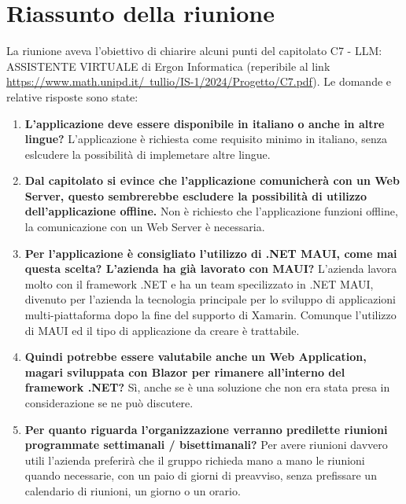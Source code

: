 \section{Riassunto della riunione}

    La riunione aveva l'obiettivo di chiarire alcuni punti del capitolato C7 - LLM: ASSISTENTE VIRTUALE di Ergon Informatica (reperibile al link \href{https://www.math.unipd.it/~tullio/IS-1/2024/Progetto/C7.pdf}{https://www.math.unipd.it/~tullio/IS-1/2024/Progetto/C7.pdf}). Le domande e relative risposte sono state:
\begin{enumerate}
    \item \textbf{L'applicazione deve essere disponibile in italiano o anche in altre lingue?} L'applicazione è richiesta come requisito minimo in italiano, senza eslcudere la possibilità di implemetare altre lingue.
    \item \textbf{Dal capitolato si evince che l'applicazione comunicherà con un Web Server, questo sembrerebbe escludere la possibilità di utilizzo dell'applicazione offline.} Non è richiesto che l'applicazione funzioni offline, la comunicazione con un Web Server è necessaria.
     \item \textbf{Per l'applicazione è consigliato l'utilizzo di .NET MAUI, come mai questa scelta? L'azienda ha già lavorato con MAUI?} L'azienda lavora molto con il framework .NET e ha un team specilizzato in .NET MAUI, divenuto per l'azienda la tecnologia principale per lo sviluppo di applicazioni multi-piattaforma dopo la fine del supporto di Xamarin. Comunque l'utilizzo di MAUI ed il tipo di applicazione da creare è trattabile. 
    \item \textbf{Quindi potrebbe essere valutabile anche un Web Application, magari sviluppata con Blazor per rimanere all'interno del framework .NET?} Sì, anche se è una soluzione che non era stata presa in considerazione se ne può discutere.
    \item \textbf{Per quanto riguarda l'organizzazione verranno predilette riunioni programmate settimanali / bisettimanali?} Per avere riunioni davvero utili l'azienda preferirà che il gruppo richieda mano a mano le riunioni quando necessarie, con un paio di giorni di preavviso, senza prefissare un calendario di riunioni, un giorno o un orario.

\end{enumerate}


